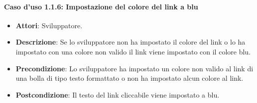 \paragraph{Caso d'uso 1.1.6: Impostazione del colore del link a blu}
\begin{itemize}
\item\textbf{Attori}: Sviluppatore.
\item\textbf{Descrizione}: Se lo sviluppatore non ha impostato il colore del link o lo ha impostato con una colore non valido il link viene impostato con il colore blu.
\item\textbf{Precondizione}: Lo sviluppatore ha impostato un colore non valido al link di una bolla di tipo testo formattato o non ha impostato alcun colore al link.
\item\textbf{Postcondizione}: Il testo del link cliccabile viene impostato a blu.
\end{itemize}